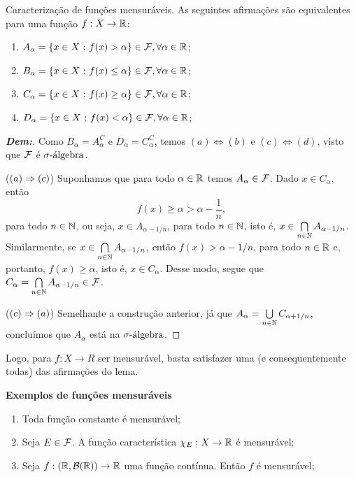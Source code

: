 \begin{lemma*}{Caracterização de funções mensuráveis.}
  As seguintes afirmações são equivalentes para uma função $f:X\rightarrow \bR$:
  \begin{enumerate}[label=\alph*)]
    \item $A_\alpha = \set{x \in X \st f(x) > \alpha} \in \mcal F, \forall \alpha \in \mbb R$;
    \item $B_\alpha = \set{x \in X \st f(x) \le \alpha} \in \mcal F, \forall \alpha \in \mbb R$;
    \item $C_\alpha = \set{x \in X \st f(x) \ge \alpha} \in \mcal F, \forall \alpha \in \mbb R$;
    \item $D_\alpha = \set{x \in X \st f(x) < \alpha} \in \mcal F, \forall \alpha \in \mbb R$;
  \end{enumerate}
\end{lemma*}
\begin{proof}[\textbf{Dem:}] Como $B_\alpha = A_\alpha^C$ e $D_\alpha = C_\alpha^C$,
  temos $(a) \Leftrightarrow (b)$ e $(c) \Leftrightarrow (d)$, visto que $\mcal F$ 
  é $\sigmaalg$. 
  \vspace{5mm}

  \noindent
  ($(a) \myimplies (c)$) Suponhamos que para todo $\alpha \in \bR$
  temos $A_\alpha \in \mcal F$. Dado $x \in C_\alpha$, 
  então $$f(x) \ge \alpha > \alpha - \frac{1}{n},$$ 
  para todo $n \in \bN$, ou seja, $x \in A_{\alpha - 1/n}$, para todo $n \in \mbb N$, 
  isto é, $x \in \mycap n \bN A_{\alpha - 1/n}$. Similarmente, se $x \in \mycap n 
  \bN A_{\alpha - 1/n}$, então $f(x)> \alpha - 1/n$, para todo $n \in \bR$ e, portanto, 
  $f(x) \ge \alpha$, isto é, $x \in C_\alpha$. Desse modo, segue que 
  $C_\alpha = \mycap n \bN A_{\alpha - 1/n} \in \mcal F$.
  \vspace{5mm}

  \noindent
  ($(c) \myimplies (a)$) Semelhante a construção anterior, já que $A_\alpha = \mycup 
  n \bN C_{\alpha + 1/n}$, concluímos que $A_\alpha$ está na $\sigmaalg$.
\end{proof}
\bigline

Logo, para $f: X \rightarrow R$ ser mensurável, basta satisfazer uma (e consequentemente
todas) das afirmações do lema.

\bigline
\newpage
\noindent
\textbf{Exemplos de funções mensuráveis}
\begin{enumerate}
  \item Toda função constante é mensurável;
  \item Seja $E \in \mcal F$. A função característica $\chi_E: X \rightarrow \bR$ é mensurável;
  \item Seja $f:(\bR, \borelR) \rightarrow \bR$ uma função contínua. Então 
  $f$ é mensurável;
\end{enumerate}

